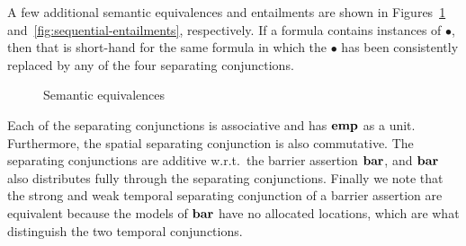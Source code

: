 \documentclass[11pt]{report}
\begin{document}
A few additional semantic equivalences and entailments are shown in Figures~\ref{fig:sequential-equivalences} and~\ref{fig:sequential-entailments}, respectively. If a formula contains instances of $\bullet$, then that is short-hand for the same formula in which the $\bullet$ has been consistently replaced by any of the four separating conjunctions. 

\begin{figure}[ht]
    \centering
    \caption{\label{fig:sequential-equivalences}Semantic equivalences}
\end{figure}

Each of the separating conjunctions is associative and has $\mathbf{emp}$ as a unit. Furthermore, the spatial separating conjunction is also commutative. The separating conjunctions are additive w.r.t.\ the barrier assertion $\mathbf{bar}$, and $\mathbf{bar}$ also distributes fully through the separating conjunctions. Finally we note that the strong and weak temporal separating conjunction of a barrier assertion are equivalent because the models of $\mathbf{bar}$ have no allocated locations, which are what distinguish the two temporal conjunctions. 
\end{document}
